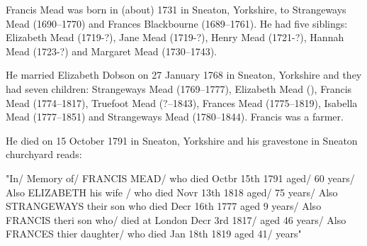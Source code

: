 
Francis Mead was born in (about) 1731 in Sneaton, Yorkshire, to Strangeways Mead (1690--1770) and Frances Blackbourne (1689--1761). He had five siblings: Elizabeth Mead (1719-?), Jane Mead (1719-?), Henry Mead (1721-?), Hannah Mead (1723-?) and Margaret Mead (1730--1743). 

He married Elizabeth Dobson on 27 January 1768 in Sneaton, Yorkshire and they had seven children:  Strangeways Mead (1769--1777), Elizabeth Mead (), Francis Mead (1774--1817), Truefoot Mead (?--1843), Frances Mead (1775--1819), Isabella Mead (1777--1851) and Strangeways Mead (1780--1844). Francis was a farmer.

He died on 15 October 1791 in	Sneaton, Yorkshire \cite{FMeadDeath} and his gravestone in Sneaton churchyard reads:

"In/ Memory of/ FRANCIS MEAD/ who died Octbr 15th 1791 aged/ 60 years/ Also ELIZABETH his wife / who died Novr 13th 1818 aged/ 75 years/ Also STRANGEWAYS their son who died Decr 16th 1777 aged 9 years/ Also FRANCIS theri son who/ died at London Decr 3rd 1817/ aged 46 years/ Also FRANCES thier daughter/ who died Jan 18th 1819 aged 41/ years"

